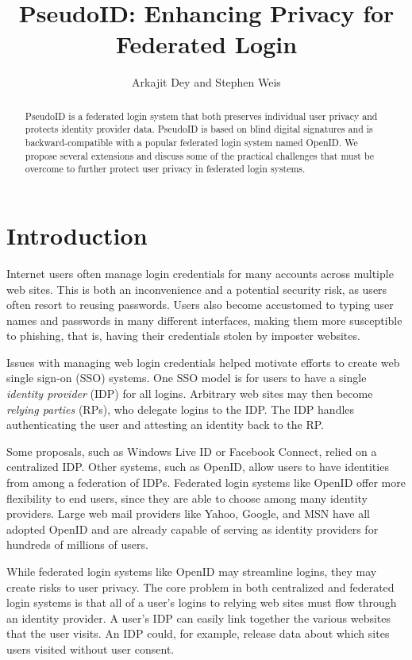 \documentclass{llncs}
\title{PseudoID: Enhancing Privacy for Federated Login}
\author{Arkajit Dey\inst{1} and Stephen Weis\inst{2}}
\institute{Massachusetts Institute of Technology, Cambridge, MA, USA 02139
\and
Google Inc., Mountain View, CA, USA 94043}
\begin{document}
\maketitle

\begin{abstract}
  PseudoID is a federated login system that both preserves individual
  user privacy and protects identity provider data. PseudoID is based
  on blind digital signatures and is backward-compatible with a popular
  federated login system named OpenID. We propose several extensions
  and discuss some of the practical challenges that must be overcome
  to further protect user privacy in federated login systems.
\end{abstract}

\section{Introduction}
\label{sec:intro}

Internet users often manage login credentials for many accounts across
multiple web sites. This is both an inconvenience and a potential
security risk, as users often resort to reusing passwords. Users also
become accustomed to typing user names and passwords in many different
interfaces, making them more susceptible to phishing, that is, having
their credentials stolen by imposter websites.

Issues with managing web login credentials helped motivate efforts to
create web single sign-on (SSO) systems. One SSO model is for users to
have a single \emph{identity provider} (IDP) for all logins. Arbitrary
web sites may then become \emph{relying parties} (RPs), who delegate
logins to the IDP. The IDP handles authenticating the user and
attesting an identity back to the RP.

Some proposals, such as Windows Live ID or Facebook Connect, relied on
a centralized IDP. Other systems, such as OpenID, allow users to have
identities from among a federation of IDPs. Federated login systems
like OpenID offer more flexibility to end users, since they are able
to choose among many identity providers. Large web mail providers like
Yahoo, Google, and MSN have all adopted OpenID
\cite{Yah08,Sac08,WLOP08} and are already capable of serving as
identity providers for hundreds of millions of users.

While federated login systems like OpenID may streamline logins, they
may create risks to user privacy. The core problem in both centralized
and federated login systems is that all of a user's logins to relying
web sites must flow through an identity provider. A user's IDP can
easily link together the various websites that the user visits. An
IDP could, for example, release data about which sites users visited
without user consent.
\end{document}
